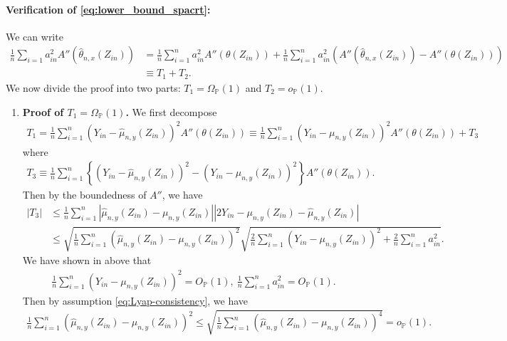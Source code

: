\documentclass[12pt]{article}
\theoremstyle{definition}
\def\P{\mathbb{P}}
\def\P{\mathbb{P}}
\renewcommand{\P}{\mathbb{P}}							%
\newcommand{\srz}{Z}									%
\newcommand{\sry}{Y}									%
\begin{document}
	\paragraph{Verification of \eqref{eq:lower_bound_spacrt}:}

	We can write 
	\begin{align*}
		\frac{1}{n}\sum_{i=1}a_{in}^2A''(\widehat \theta_{n,x}(\srz_{in}))
		&
		=\frac{1}{n}\sum_{i=1}^n a_{in}^2A''(\theta(\srz_{in}))+\frac{1}{n}\sum_{i=1}^n a_{in}^2(A''(\widehat \theta_{n,x}(\srz_{in}))-A''(\theta(\srz_{in})))\\
		&
		\equiv T_1+T_2.
	\end{align*}
	We now divide the proof into two parts: $T_1=\Omega_\P(1)$ and $T_2=o_\P(1)$.
	\begin{enumerate}
		\item \textbf{Proof of $T_1=\Omega_\P(1)$.}
		We first decompose 
	\begin{align*}
		T_1=\frac{1}{n}\sum_{i=1}^n (\sry_{in}-\widehat{\mu}_{n,y}(\srz_{in}))^2A''(\theta(\srz_{in}))\equiv\frac{1}{n}\sum_{i=1}^n (\sry_{in}-\mu_{n,y}(\srz_{in}))^2A''(\theta(\srz_{in}))+T_3
	\end{align*}
	where 
	\begin{align*}
		T_3\equiv  \frac{1}{n}\sum_{i=1}^n \left\{(\sry_{in}-\widehat \mu_{n,y}(\srz_{in}))^2-(\sry_{in}- \mu_{n,y}(\srz_{in}))^2\right\}A''(\theta(\srz_{in})).
	\end{align*}
	Then by the boundedness of $A''$, we have 
	\begin{align*}
		|T_3|
		&
		\leq \frac{1}{n}\sum_{i=1}^n|\widehat{\mu}_{n,y}(\srz_{in})-\mu_{n,y}(\srz_{in})||2\sry_{in}-\mu_{n,y}(\srz_{in})-\widehat\mu_{n,y}(\srz_{in})|\\
		&
		\leq \sqrt{\frac{1}{n}\sum_{i=1}^n (\widehat{\mu}_{n,y}(\srz_{in})-\mu_{n,y}(\srz_{in}))^2}\sqrt{\frac{2}{n}\sum_{i=1}^n (\sry_{in}-\mu_{n,y}(\srz_{in}))^2+\frac{2}{n}\sum_{i=1}^n a_{in}^2}.
	\end{align*}
	We have shown in above that 
	\begin{align*}
		\frac{1}{n}\sum_{i=1}^n (\sry_{in}-\mu_{n,y}(\srz_{in}))^2=O_{\P}(1),\ \frac{1}{n}\sum_{i=1}^n a_{in}^2=O_{\P}(1).
	\end{align*}
	Then by assumption \eqref{eq:Lyap-consistency}, we have 
	\begin{align*}
		\frac{1}{n}\sum_{i=1}^n (\widehat{\mu}_{n,y}(\srz_{in})-\mu_{n,y}(\srz_{in}))^2\leq \sqrt{\frac{1}{n}\sum_{i=1}^n (\widehat{\mu}_{n,y}(\srz_{in})-\mu_{n,y}(\srz_{in}))^4}=o_{\P}(1).
	\end{align*}

\end{enumerate}
\end{document}
